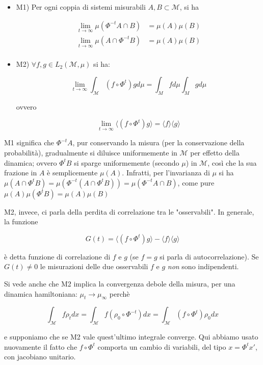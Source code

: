 \documentclass{article}
\begin{document}
\begin{itemize}

\item M1) Per ogni coppia di sistemi misurabili $A,B \subset \mathcal{M} $, si ha

\begin{align*}
\lim\limits_{t \to \infty} \mu(\Phi^{-t} A \cap B) &= \mu(A) \mu(B) \\
\lim\limits_{t \to \infty} \mu(A \cap  \Phi^{-t} B) &= \mu(A) \mu(B) \\
\end{align*}

\item M2) $\forall f,g \in L_2(\mathcal{M},\mu)$ si ha:

$$ \lim\limits_{t \to \infty} \int_{\mathcal{M}} (f \circ \Phi^t) g d\mu = \int_{M} f d\mu  \int_{M} g d\mu $$

ovvero

$$ \lim\limits_{t \to \infty} \langle (f \circ \Phi^t) g \rangle = \langle f \rangle \langle g \rangle$$

\end{itemize}

M1 significa che $\Phi^{-t} A$, pur conservando la misura (per la conservazione della probabilità), gradualmente si diluisce uniformemente in $\mathcal{M}$ per effetto della dinamica; ovvero $\Phi^t B$ si sparge uniformemente (secondo $\mu$) in $\mathcal{M}$, così che la sua frazione in $A$ è semplicemente $\mu(A)$. Infratti, per l'invarianza di $\mu$ si ha $\mu(A \cap \Phi^t B) = \mu(\Phi^{-t} (A \cap \Phi^t B)) = \mu(\Phi^{-t} A \cap B)$, come pure $\mu(A)\mu(\Phi^t B) = \mu(A)\mu(B)$

M2, invece, ci parla della perdita di correlazione tra le "osservabili". In generale, la funzione

$$G(t) = \langle (f \circ \Phi^t) g \rangle - \langle f \rangle \langle g \rangle$$

è detta funzione di correlazione di $f$ e $g$ (se $f=g$ si parla di autocorrelazione). Se $G(t) \neq 0$ le misurazioni delle due osservabili $f$ e $g$ \emph{non} sono indipendenti.

Si vede anche che M2 implica la convergenza debole della misura, per una dinamica hamiltoniana: $\mu_t \to \mu_{\infty}$ perchè

$$\int_{\mathcal{M}} f \rho_t dx = \int_{\mathcal{M}} f (\rho_0 \circ \Phi^{-t}) dx =  \int_{\mathcal{M}} (f \circ \Phi^t )\rho_0 dx$$

e supponiamo che se M2 vale quest'ultimo integrale converge. Qui abbiamo usato nuovamente il fatto che $f \circ \Phi^t$ comporta un cambio di variabili, del tipo $x = \Phi^t x'$, con jacobiano unitario.
\end{document}
